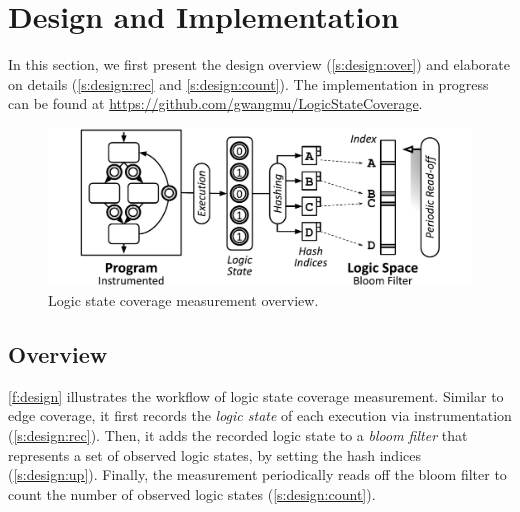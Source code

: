 \documentclass[letterpaper,twocolumn,10pt]{article}
\begin{document}


\section{Design and Implementation}
\label{s:design}

In this section, we first present the design overview (\autoref{s:design:over})
and elaborate on details (\autoref{s:design:rec} and
\ref{s:design:count}). The implementation in progress can be found at
\url{https://github.com/gwangmu/LogicStateCoverage}.

\begin{figure}[t]
  \centering
  \includegraphics[width=\columnwidth]{images/design.pdf}
  \caption{Logic state coverage measurement overview.}
  \label{f:design}
\end{figure}


\subsection{Overview}
\label{s:design:over}


\autoref{f:design} illustrates the workflow of logic state coverage
measurement. Similar to edge coverage, it first records the \emph{logic state}
of each execution via instrumentation (\autoref{s:design:rec}). Then, it adds
the recorded logic state to a \emph{bloom filter} that represents a set of
observed logic states, by setting the hash indices (\autoref{s:design:up}).
Finally, the measurement periodically reads off the bloom filter to count the
number of observed logic states (\autoref{s:design:count}).
\end{document}
